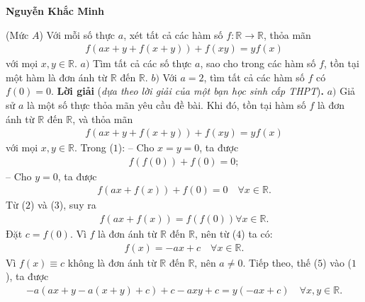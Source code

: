 \begin{multicols}{2}
	\begin{flushright}
		\textbf{\color{thachthuctoanhoc}Nguyễn Khắc Minh}
	\end{flushright}
	{}
	(Mức $A$) Với mỗi số thực $a$, xét tất cả các hàm số $f: \mathbb{R} \to \mathbb{R}$, thỏa mãn
	\begin{align*}
		f\left( {ax + y + f\left( {x + y} \right)} \right) + f\left( {xy} \right) = yf\left( x \right)
	\end{align*}
	với mọi $x, y \in \mathbb{R}$.
	\vskip 0.05cm
	$a)$ Tìm tất cả các số thực $a$, sao cho trong các hàm số $f$, tồn tại một hàm là đơn ánh từ $\mathbb{R}$  đến $\mathbb{R}$.
	\vskip 0.05cm
	$b)$ Với $a = 2$, tìm tất cả các hàm số $f$ có $f(0) = 0$.
	\vskip 0.05cm 
	\textbf{\color{thachthuctoanhoc}Lời giải} (\textit{dựa theo lời giải của một bạn học sinh cấp THPT})\textbf{\color{thachthuctoanhoc}.}
	\vskip 0.05cm
	$a)$ Giả sử $a$ là một số thực thỏa mãn yêu cầu đề bài. Khi đó, tồn tại hàm số $f$ là đơn ánh từ  $\mathbb{R}$ đến  $\mathbb{R}$, và thỏa mãn
	\begin{align*}
		f\left( {ax + y + f\left( {x + y} \right)} \right) + f\left( {xy} \right) = yf\left( x \right) \tag{$1$}
	\end{align*}
	với mọi $x,y \in \mathbb{R}$.
	\vskip 0.05cm
	Trong ($1$):
	\vskip 0.05cm
	-- Cho $x = y = 0$, ta được
	\begin{align*}
		f\left( {f\left( 0 \right)} \right) + f\left( 0 \right) = 0; \tag{$2$}
	\end{align*}
	-- Cho $y = 0$, ta được
	\begin{align*}
		f\left( {ax + f\left( x \right)} \right) + f\left( 0 \right) = 0 \quad \forall x \in \mathbb{R}. \tag{$3$}
	\end{align*}
	Từ ($2$) và ($3$), suy ra
	\begin{align*}
		f\left( {ax + f\left( x \right)} \right) = f\left( {f\left( 0 \right)} \right) \forall x \in \mathbb{R}. \tag{$4$}
	\end{align*}
	Đặt $c = f(0)$.  Vì  $f$ là đơn ánh từ $\mathbb{R}$  đến  $\mathbb{R}$, nên từ ($4$) ta có:
	\begin{align*}
		f\left( x \right) =  - ax + c \quad \forall x \in \mathbb{R}. \tag{$5$}
	\end{align*}
	Vì  $f(x) \equiv c$ không là đơn ánh từ  $\mathbb{R}$ đến  $\mathbb{R}$, nên $a \ne 0$.
	\vskip 0.05cm
	Tiếp theo, thế ($5$) vào ($1$), ta được
	\begin{align*}
		- a\left( {ax + y - a\left( {x + y} \right) + c} \right) + c - axy + c = y\left( { - ax + c} \right) \quad \forall x,y \in \mathbb{R}. \tag{$6$}

\end{align*}
\end{multicols}
